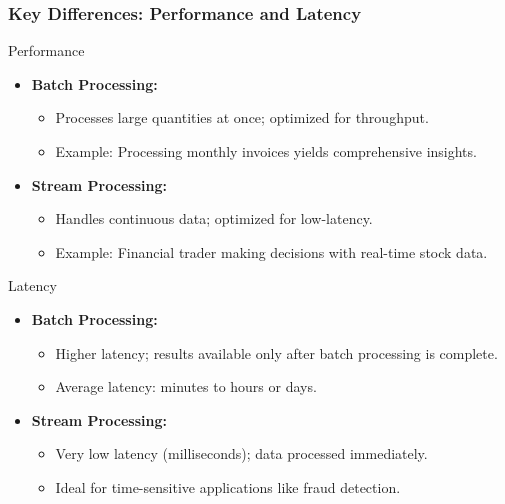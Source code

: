 \documentclass[aspectratio=169]{beamer}
\begin{document}
\begin{frame}[fragile]
    \frametitle{Key Differences: Performance and Latency}
    \begin{block}{Performance}
        \begin{itemize}
            \item \textbf{Batch Processing:} 
                \begin{itemize}
                    \item Processes large quantities at once; optimized for throughput.
                    \item Example: Processing monthly invoices yields comprehensive insights.
                \end{itemize}
            \item \textbf{Stream Processing:}
                \begin{itemize}
                    \item Handles continuous data; optimized for low-latency.
                    \item Example: Financial trader making decisions with real-time stock data.
                \end{itemize}
        \end{itemize}
    \end{block}

    \begin{block}{Latency}
        \begin{itemize}
            \item \textbf{Batch Processing:} 
                \begin{itemize}
                    \item Higher latency; results available only after batch processing is complete.
                    \item Average latency: minutes to hours or days.
                \end{itemize}
            \item \textbf{Stream Processing:}
                \begin{itemize}
                    \item Very low latency (milliseconds); data processed immediately.
                    \item Ideal for time-sensitive applications like fraud detection.
                \end{itemize}
        \end{itemize}
    \end{block}
\end{frame}
\end{document}
